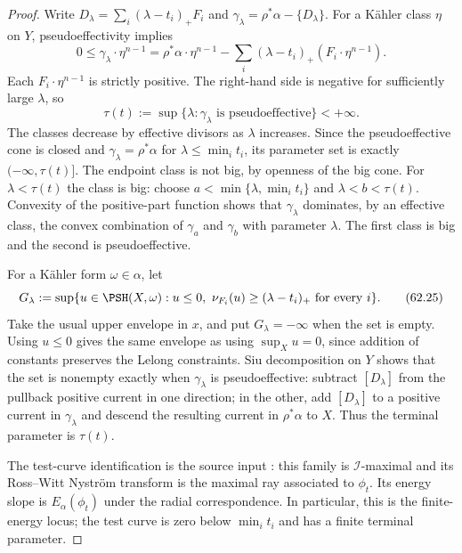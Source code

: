 \begin{proof}
Write $D_\lambda=\sum_i(\lambda-t_i)_+F_i$ and
$\gamma_\lambda=\rho^*\alpha-\{D_\lambda\}$.
For a K\"ahler class $\eta$ on $Y$, pseudoeffectivity implies
\[
 0\leq\gamma_\lambda\cdot\eta^{n-1}
   =\rho^*\alpha\cdot\eta^{n-1}
      -\sum_i(\lambda-t_i)_+(F_i\cdot\eta^{n-1}).
\]
Each $F_i\cdot\eta^{n-1}$ is strictly positive.  The right-hand
side is negative for sufficiently large $\lambda$, so
\[
 \tau(t):=\sup\{\lambda:\gamma_\lambda
                               \text{ is pseudoeffective}\}<+\infty.
\]
The classes decrease by effective divisors as $\lambda$ increases.
Since the pseudoeffective cone is closed and
$\gamma_\lambda=\rho^*\alpha$ for $\lambda\leq\min_i t_i$,
its parameter set is exactly $(-\infty,\tau(t)]$.
The endpoint class is not big, by openness of the big cone.
For $\lambda<\tau(t)$ the class is big: choose
$a<\min\{\lambda,\min_i t_i\}$ and $\lambda<b<\tau(t)$.
Convexity of the positive-part function shows that
$\gamma_\lambda$ dominates, by an effective class, the convex
combination of $\gamma_a$ and $\gamma_b$ with parameter $\lambda$.
The first class is big and the second is pseudoeffective.

For a K\"ahler form $\omega\in\alpha$, let
\[
 G_\lambda:=\sup\{u\in\PSH(X,\omega):u\leq0,\
                 \nu_{F_i}(u)\geq(\lambda-t_i)_+
                                      \text{ for every }i\}.
\tag{62.25}\label{eq:mpwn-rwn-test-curve}
\]
Take the usual upper envelope in $x$, and put $G_\lambda=-\infty$
when the set is empty.  Using $u\leq0$ gives the same envelope
as using $\sup_Xu=0$, since addition of constants preserves the
Lelong constraints.  Siu decomposition on $Y$ shows that the set
is nonempty exactly when $\gamma_\lambda$ is pseudoeffective:
subtract $[D_\lambda]$ from the pullback positive current in one
direction; in the other, add $[D_\lambda]$ to a positive current
in $\gamma_\lambda$ and descend the resulting current in
$\rho^*\alpha$ to $X$.
Thus the terminal parameter is $\tau(t)$.

The test-curve identification is the source input
\cite[Lemma~10.1.1]{MPWN25}: this family is
$\mathcal I$-maximal and its Ross--Witt Nystr\"om transform is the
maximal ray associated to $\phi_t$.  Its energy slope is
$E_\alpha(\phi_t)$ under the radial correspondence.
In particular, this is the finite-energy locus; the test curve
is zero below $\min_i t_i$ and has a finite terminal parameter.


\end{proof}
